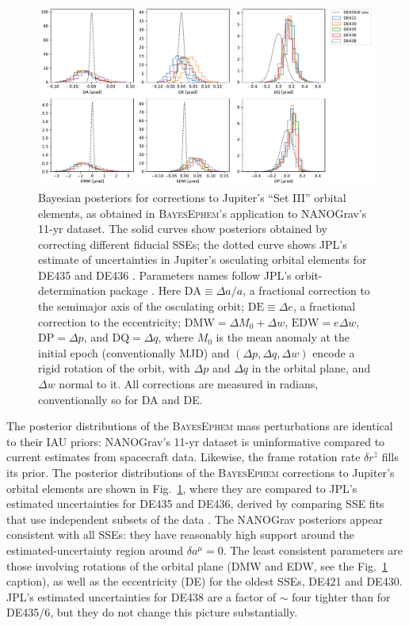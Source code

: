 \documentclass[reprint,
 amsmath,amssymb,
 aps,prd,floatfix,
]{revtex4-1}
\begin{document}
%
\begin{figure}[t]
    \includegraphics[width=2\columnwidth]{figures/setIII-posteriors.pdf}
    \caption{Bayesian posteriors for corrections to Jupiter's ``Set III'' orbital elements, as obtained in \textsc{BayesEphem}'s application to NANOGrav's 11-yr dataset. The solid curves show posteriors obtained by correcting different fiducial SSEs; the dotted curve shows JPL's estimate of uncertainties in Jupiter's osculating orbital elements for DE435 and DE436 \cite{de434}.
    Parameters names follow JPL's orbit-determination package \cite{moyer2003}. %
    Here $\mathrm{DA} \equiv \Delta a/a$, a fractional correction to the semimajor axis of the osculating orbit; $\mathrm{DE} \equiv \Delta e$, a fractional correction to the eccentricity; $\mathrm{DMW} = \Delta M_0 + \Delta w$, $\mathrm{EDW} = e \Delta w$, $\mathrm{DP} = \Delta p$, and $\mathrm{DQ} = \Delta q$, where $M_0$ is the mean anomaly at the initial epoch (conventionally MJD) and $(\Delta p, \Delta q, \Delta w)$ encode a rigid rotation of the orbit, with $\Delta p$ and $\Delta q$ in the orbital plane, and $\Delta w$ normal to it. All corrections are measured in radians, conventionally so for DA and DE.}
    \label{fig:setIIIposteriors}
\end{figure}

The posterior distributions of the \textsc{BayesEphem} mass perturbations are identical to their IAU priors:  NANOGrav's 11-yr dataset is uninformative compared to current estimates from spacecraft data. Likewise, the frame rotation rate $\delta r^{\hat{z}}$ fills its prior.
The posterior distributions of the \textsc{BayesEphem} corrections to Jupiter's orbital elements are shown in Fig.\ \ref{fig:setIIIposteriors}, where they are compared to JPL's estimated uncertainties for DE435 and DE436, derived by comparing SSE fits that use independent subsets of the data \cite{de434}. The NANOGrav posteriors appear consistent with all SSEs: they have reasonably high support around the estimated-uncertainty region around $\delta a^\mu = 0$. The least consistent parameters are those involving rotations of the orbital plane (DMW and EDW, see the Fig.\ \ref{fig:setIIIposteriors} caption), as well as the eccentricity (DE) for the oldest SSEs, DE421 and DE430. JPL's estimated uncertainties for DE438 are a factor of $\sim$ four tighter than for DE435/6, but they do not change this picture substantially.
\end{document}
